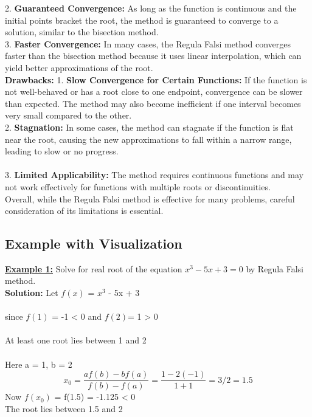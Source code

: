 \documentclass[12pt,a4paper]{article}
\begin{document}
	2. \textbf{Guaranteed Convergence:} As long as the function is continuous and the initial points bracket the root, the method is guaranteed to converge to a solution, similar to the bisection method. \\ 
	
	3. \textbf{Faster Convergence:} In many cases, the Regula Falsi method converges faster than the bisection method because it uses linear interpolation, which can yield better approximations of the root.\\
	
	\textbf{Drawbacks:} \vspace{0.5cm}
	1. \textbf{Slow Convergence for Certain Functions:} If the function is not well-behaved or has a root close to one endpoint, convergence can be slower than expected. The method may also become inefficient if one interval becomes very small compared to the other.\\
	
	2. \textbf{Stagnation:} In some cases, the method can stagnate if the function is flat near the root, causing the new approximations to fall within a narrow range, leading to slow or no progress.\\ \\
	3. \textbf{Limited Applicability:} The method requires continuous functions and may not work effectively for functions with multiple roots or discontinuities. \\
	
	Overall, while the Regula Falsi method is effective for many problems, careful consideration of its limitations is essential.
	\subsection{Example with Visualization}
	\textbf{\underline{Example 1:}} Solve for real root of the equation $x^3 - 5x + 3 = 0$ by Regula Falsi method. \\
	
	\textbf{Solution:} Let \(f(x)\) = $x^3$ - 5x + 3 \\ \\
	since \(f(1)\) = -1 < 0 and \(f(2)\)= 1 > 0 \\ \\
	At least one root lies between 1 and 2 \\ \\
	Here a = 1, b = 2
	\[
	x_0 = \frac{af(b)-bf(a)}{f(b)-f(a)} = \frac{1 - 2(-1)}{1+1} = 3/2 =1.5
	\]
	Now \(f(x_0)\) = f(1.5) = -1.125 < 0 \\
	The root lies between 1.5 and 2
	
\end{document}
